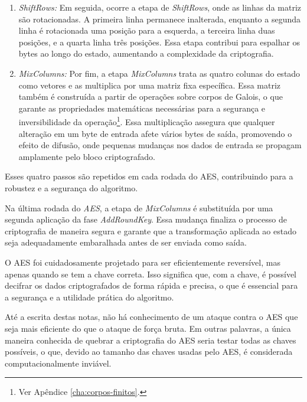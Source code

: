 \begin{enumerate}
\item {\em ShiftRows:}
  Em seguida, ocorre a etapa de \textit{ShiftRows}, onde as linhas da matriz são rotacionadas.
  A primeira linha permanece inalterada, enquanto a segunda linha é rotacionada uma posição para a esquerda, a terceira linha duas posições, e a quarta linha três posições.
  Essa etapa contribui para espalhar os bytes ao longo do estado, aumentando a complexidade da criptografia.

\item {\em MixColumns:}
  Por fim, a etapa {\em MixColumns} trata as quatro colunas do estado como vetores e as multiplica por uma matriz fixa específica.
  Essa matriz também é construída a partir de operações sobre corpos de Galois, o que garante as propriedades matemáticas necessárias para a segurança e inversibilidade da operação\footnote{Ver Apêndice \ref{cha:corpos-finitos}.}.
  Essa multiplicação assegura que qualquer alteração em um byte de entrada afete vários bytes de saída, promovendo o efeito de difusão, onde pequenas mudanças nos dados de entrada se propagam amplamente pelo bloco criptografado.
  
\end{enumerate}

Esses quatro passos são repetidos em cada rodada do AES, contribuindo para a robustez e a segurança do algoritmo.

Na última rodada do \textit{AES}, a etapa de \textit{MixColumns} é substituída por uma segunda aplicação da fase \textit{AddRoundKey}.
Essa mudança finaliza o processo de criptografia de maneira segura e garante que a transformação aplicada ao estado seja adequadamente embaralhada antes de ser enviada como saída.

O AES foi cuidadosamente projetado para ser eficientemente reversível, mas apenas quando se tem a chave correta.
Isso significa que, com a chave, é possível decifrar os dados criptografados de forma rápida e precisa, o que é essencial para a segurança e a utilidade prática do algoritmo.

Até a escrita destas notas, não há conhecimento de um ataque contra o AES que seja mais eficiente do que o ataque de força bruta.
Em outras palavras, a única maneira conhecida de quebrar a criptografia do AES seria testar todas as chaves possíveis, o que, devido ao tamanho das chaves usadas pelo AES, é considerada computacionalmente inviável.


